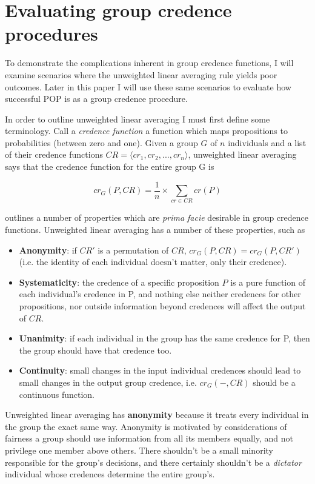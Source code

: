 \documentclass{article}
\begin{document}
\section{Evaluating group credence procedures}

To demonstrate the complications inherent in group credence functions, I will examine scenarios where the unweighted linear averaging rule yields poor outcomes. Later in this paper I will use these same scenarios to evaluate how successful POP is as a group credence procedure.

In order to outline unweighted linear averaging I must first define some terminology. Call a \textit{credence function} a function which maps propositions to probabilities (between zero and one). Given a group \(G\) of \(n\) individuals and a list of their credence functions \(CR = \langle cr_1, cr_2, ..., cr_n\rangle\), unweighted linear averaging says that the credence function for the entire group G is 

\[cr_G(P,CR) = \frac{1}{n}\times\sum_{cr \in CR}cr(P)\]

\noindent 
\citet{russell2015groupthink} outlines a number of properties which are \textit{prima facie} desirable in group credence functions. Unweighted linear averaging has a number of these properties, such as 

\begin{itemize}
	\item \textbf{Anonymity}: if \(CR'\) is a permutation of \(CR\), \(cr_G(P, CR) = cr_G(P, CR')\) (i.e. the identity of each individual doesn't matter, only their credence).
	\item \textbf{Systematicity}: the credence of a specific proposition \(P\) is a pure function of each individual's credence in P, and nothing else \textemdash{} neither credences for other propositions, nor outside information beyond credences will affect the output of \(CR\).
	\item \textbf{Unanimity}: if each individual in the group has the same credence for P, then the group should have that credence too.
	\item \textbf{Continuity}: small changes in the input individual credences should lead to small changes in the output group credence, i.e. \(cr_G(-,CR)\) should be a continuous function.
\end{itemize}

Unweighted linear averaging has \textbf{anonymity} because it treats every individual in the group the exact same way. Anonymity is motivated by considerations of fairness \textemdash{} a group should use information from all its members equally, and not privilege one member above others. There shouldn't be a small minority responsible for the group's decisions, and there certainly shouldn't be a \textit{dictator} individual whose credences determine the entire group's.
\end{document}
